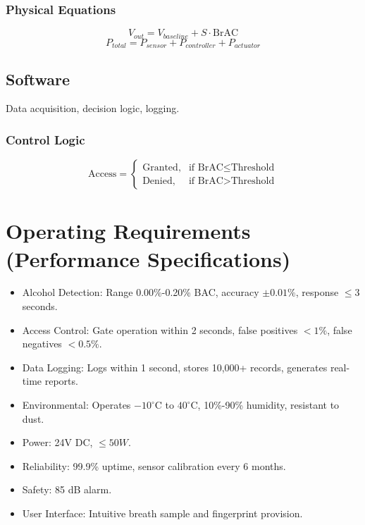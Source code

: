 \documentclass[a4paper,12pt]{article}
\begin{document}
\subsubsection{Physical Equations}
\begin{equation}
    V_{out} = V_{baseline} + S \cdot \text{BrAC}
\end{equation}
\begin{equation}
    P_{total} = P_{sensor} + P_{controller} + P_{actuator}
\end{equation}

\subsection{Software}
Data acquisition, decision logic, logging.
\subsubsection{Control Logic}
\begin{equation}
    \text{Access} = 
    \begin{cases}
    \text{Granted}, & \text{if BrAC} \leq \text{Threshold} \\
    \text{Denied}, & \text{if BrAC} > \text{Threshold}
    \end{cases}
\end{equation}

\section{Operating Requirements (Performance Specifications)}
\begin{itemize}
    \item Alcohol Detection: Range 0.00\%-0.20\% BAC, accuracy $\pm 0.01\%$, response $\leq 3$ seconds.
    \item Access Control: Gate operation within 2 seconds, false positives $< 1\%$, false negatives $< 0.5\%$.
    \item Data Logging: Logs within 1 second, stores 10,000+ records, generates real-time reports.
    \item Environmental: Operates $-10^\circ$C to $40^\circ$C, 10\%-90\% humidity, resistant to dust.
    \item Power: 24V DC, $\leq 50W$.
    \item Reliability: 99.9\% uptime, sensor calibration every 6 months.
    \item Safety: 85 dB alarm.
    \item User Interface: Intuitive breath sample and fingerprint provision.
\end{itemize}
\end{document}
